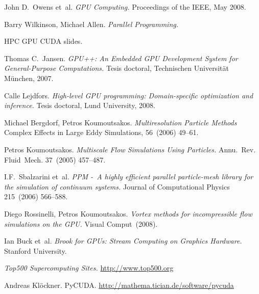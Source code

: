 \documentclass[11pt,spanish]{article}
\newcommand{\reftitle}{\textit}
\begin{document}
\begin{thebibliography}{99}
    John D.~Owens et~al.
    \reftitle{GPU Computing.}
    Proceedings of the IEEE, May 2008.

    Barry Wilkinson, Michael Allen.
    \reftitle{Parallel Programming.}

    HPC GPU CUDA slides.

    Thomas C.~Jansen.
    \reftitle{GPU++: An Embedded GPU Development System for
      General-Purpose Computations.}
    Tesis doctoral, Technischen Universität München, 2007.

    Calle Lejdfors.
    \reftitle{High-level GPU programming: Domain-specific optimization and inference.}
    Tesis doctoral, Lund University, 2008.

    Michael Bergdorf, Petros Koumoutsakos.
    \reftitle{Multiresolution Particle Methods}
    Complex Effects in Large Eddy Simulations, 56~(2006) 49--61.

    Petros Koumoutsakos.
    \reftitle{Multiscale Flow Simulations Using Particles.}
    Annu.~Rev. Fluid~Mech. 37~(2005) 457--487.

    I.F.~Sbalzarini et~al.
    \reftitle{PPM -~A highly efficient parallel particle-mesh library
      for the simulation of continuum systems.}
    Journal of Computational Physics 215~(2006) 566--588.

    Diego Rossinelli, Petros Koumoutsakos.
    \reftitle{Vortex methods for incompressible flow simulations on the GPU.}
    Visual Comput~(2008).

    Ian Buck et~al.
    \reftitle{Brook for GPUs: Stream Computing on Graphics Hardware.}
    Stanford University.

    \reftitle{Top500 Supercomputing Sites.}
    \url{http://www.top500.org}

    Andreas Klöckner.
    PyCUDA.
    \url{http://mathema.tician.de/software/pycuda}


\end{thebibliography}
\end{document}
